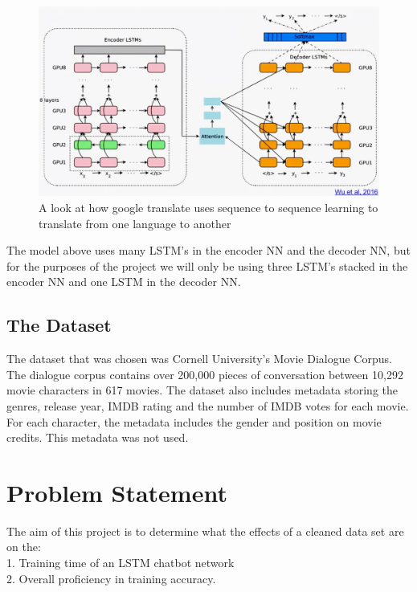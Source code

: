 \documentclass[titlepage]{article}
\newcommand\tab[1][1cm]{\hspace*{#1}}
\begin{document}
\begin{figure}[H]
	\centering
	\includegraphics[width=120mm]{Seq2seq.jpg}
	\caption{A look at how google translate uses sequence to sequence learning to translate from one language to another}
	\label{fig:seq2seqgoogletranslate}
\end{figure}
The model above uses many LSTM's in the encoder NN and the decoder NN, but for the purposes of the project we will only be using three LSTM's stacked in the encoder NN and one LSTM in the decoder NN.\\

\subsection*{The Dataset}
The dataset that was chosen was Cornell University's Movie Dialogue Corpus.\cite{chameleons, cornell} The dialogue corpus contains over 200,000 pieces of conversation between 10,292 movie characters in 617 movies. The dataset also includes metadata storing the genres, release year, IMDB rating and the number of IMDB votes for each movie. For each character, the metadata includes the gender and position on movie credits. This metadata was not used.

\section{Problem Statement}
The aim of this project is to determine what the effects of a cleaned data set are on the:\\
\tab 1. Training time of an LSTM chatbot network\\
\tab 2. Overall proficiency in training accuracy.
\end{document}

